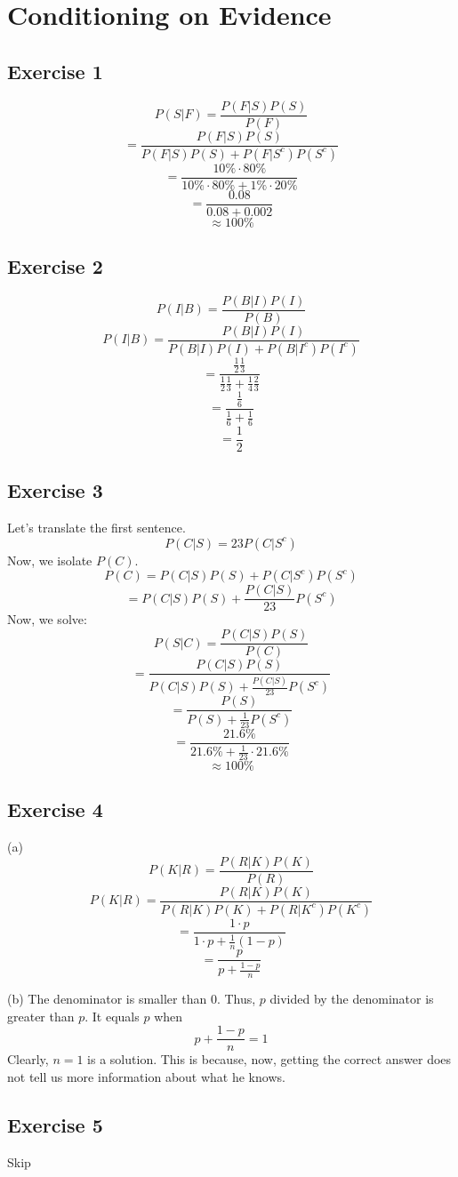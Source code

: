 \documentclass{book}
\begin{document}
\section{Conditioning on Evidence}

\subsection*{Exercise 1}
$$P(S | F) = \frac{P(F | S) P(S)}{P(F)}$$
$$= \frac{P(F | S) P(S)}{P(F | S)P(S) + P(F | S^c)P(S^c)}$$
$$= \frac{10\% \cdot 80\%}{10\% \cdot 80\% + 1\% \cdot 20\%}$$
$$= \frac{0.08}{0.08 + 0.002}$$
$$\approx 100\%$$

\subsection*{Exercise 2}
$$P(I | B) = \frac{P(B | I) P(I)}{P(B)}$$
$$P(I | B) = \frac{P(B | I) P(I)}{P(B | I) P(I) + P(B | I^c) P(I^c)}$$
$$= \frac{\frac{1}{2} \frac{1}{3}}{\frac{1}{2} \frac{1}{3} + \frac{1}{4} \frac{2}{3}}$$
$$= \frac{\frac{1}{6}}{\frac{1}{6} + \frac{1}{6}}$$
$$= \frac{1}{2}$$

\subsection*{Exercise 3}
Let's translate the first sentence.
$$P(C | S) = 23P(C | S^c)$$
Now, we isolate $P(C)$.
$$P(C) = P(C | S) P(S) + P(C | S^c) P(S^c)$$
$$= P(C | S) P(S) + \frac{P(C | S)}{23} P(S^c)$$
Now, we solve:
$$P(S | C) = \frac{P(C | S) P(S)}{P(C)}$$
$$= \frac{P(C | S) P(S)}{P(C | S) P(S) + \frac{P(C | S)}{23} P(S^c)}$$
$$= \frac{P(S)}{P(S) + \frac{1}{23} P(S^c)}$$
$$= \frac{21.6\%}{21.6\% + \frac{1}{23} \cdot 21.6\%}$$
$$\approx 100\%$$

\subsection*{Exercise 4}
(a)
$$P(K | R) = \frac{P(R | K) P(K)}{P(R)}$$
$$P(K | R) = \frac{P(R | K) P(K)}{P(R | K) P(K) + P(R | K^c) P(K^c)}$$
$$= \frac{1 \cdot p}{1 \cdot p + \frac{1}{n} (1 - p)}$$
$$= \frac{p}{p + \frac{1 - p}{n}}$$

\noindent
(b) The denominator is smaller than 0. Thus, $p$ divided by the denominator is greater than $p$. It equals $p$ when
$$p + \frac{1 - p}{n} = 1$$
Clearly, $n = 1$ is a solution. This is because, now, getting the correct answer does not tell us more information about what he knows.

\subsection*{Exercise 5}
Skip
\end{document}
